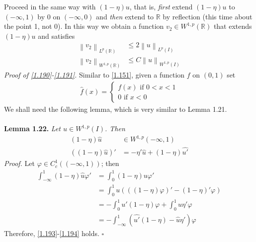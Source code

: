 \documentclass[a4paper,oneside]{article}
\numberwithin{equation}{section}
\begin{document}
Proceed in the same way with $\left(1-\eta \right)u$, that is, \textit{first} extend $\left(1-\eta \right)u$ to $\left(-\infty,1\right)$ by 0 on $\left(-\infty,0\right)$ and \textit{then} extend to $\mathbb{R}$ by reflection (this time about the point 1, not 0). In this way we obtain a function $v_2\in W^{1,p}\left(\mathbb{R}\right)$ that extends $\left(1-\eta \right)u$ and satisfies
\begin{align}
\label{1.190}
{\left\| {{v_2}} \right\|_{{L^p}\left( \mathbb{R} \right)}} &\le 2{\left\| u \right\|_{{L^p}\left( I \right)}}\\
{\left\| {{v_2}} \right\|_{{W^{1,p}}\left( \mathbb{R} \right)}} &\le C{\left\| u \right\|_{{W^{1,p}}\left( I \right)}} \label{1.191}
\end{align}
\textit{Proof of \eqref{1.190}-\eqref{1.191}.} Similar to \eqref{1.151}, given a function $f$ on $\left(0,1\right)$ set
\begin{align}
\hat f\left( x \right) = \left\{ {\begin{array}{*{20}{c}}
{f\left( x \right)\mbox{ if } 0 < x < 1}\\
{0\mbox{ if } x < 0}
\end{array}} \right.
\end{align}
We shall need the following lemma, which is very similar to Lemma 1.21.\\
\\
\textbf{Lemma 1.22.} \textit{Let $u\in W^{1,p}\left(I\right)$. Then}
\begin{align}
\label{1.193}
\left( {1 - \eta } \right)\hat u &\in {W^{1,p}}\left( { - \infty ,1} \right)\\
\left( {\left( {1 - \eta } \right)\hat u} \right)' &=  - \eta '\hat u + \left( {1 - \eta } \right)\widehat {u'} \label{1.194}
\end{align}
\textit{Proof.} Let $\varphi  \in C_c^1\left( {\left( { - \infty ,1} \right)} \right)$; then
\begin{align}
\int_{ - \infty }^1 {\left( {1 - \eta } \right)\hat u\varphi '}  &= \int_0^1 {\left( {1 - \eta } \right)u\varphi '} \\
& = \int_0^1 {u\left( {\left( {\left( {1 - \eta } \right)\varphi } \right)' - \left( {1 - \eta } \right)'\varphi } \right)} \\
& =  - \int_0^1 {u'\left( {1 - \eta } \right)\varphi }  + \int_0^1 {u\eta '\varphi } \\
& =  - \int_{ - \infty }^1 {\left( {\widehat {u'}\left( {1 - \eta } \right) - \hat u\eta '} \right)\varphi } 
\end{align}
Therefore, \eqref{1.193}-\eqref{1.194} holds. \hfill $\square$\\
\end{document}
